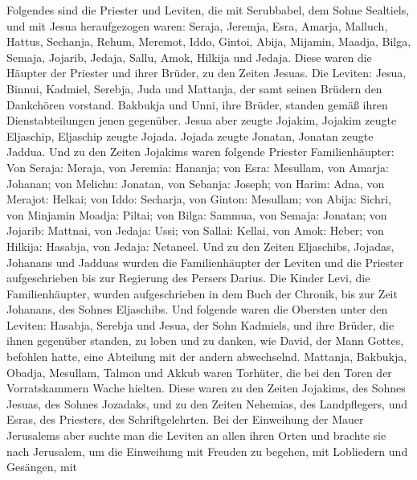  Folgendes sind die Priester und Leviten, die mit
Serubbabel, dem Sohne Sealtiels, und mit Jesua heraufgezogen waren:
Seraja, Jeremja, Esra,  Amarja, Malluch, Hattus, Sechanja,
 Rehum, Meremot, Iddo,  Gintoi, Abija,
Mijamin, Maadja, Bilga,  Semaja, Jojarib, 
Jedaja, Sallu, Amok, Hilkija und Jedaja.  Diese waren die
Häupter der Priester und ihrer Brüder, zu den Zeiten Jesuas.
 Die Leviten: Jesua, Binnui, Kadmiel, Serebja, Juda und
Mattanja, der samt seinen Brüdern den Dankchören vorstand.
 Bakbukja und Unni, ihre Brüder, standen gemäß ihren
Dienstabteilungen jenen gegenüber.  Jesua aber zeugte
Jojakim, Jojakim zeugte Eljaschip, Eljaschip zeugte Jojada.
 Jojada zeugte Jonatan, Jonatan zeugte Jaddua.
 Und zu den Zeiten Jojakims waren folgende Priester
Familienhäupter: Von Seraja: Meraja, von Jeremia: Hananja;
 von Esra: Mesullam, von Amarja: Johanan; 
von Melichu: Jonatan, von Sebanja: Joseph;  von Harim:
Adna, von Merajot: Helkai;  von Iddo: Secharja, von
Ginton: Mesullam;  von Abija: Sichri, von Minjamin
Moadja: Piltai;  von Bilga: Sammua, von Semaja: Jonatan;
 von Jojarib: Mattnai, von Jedaja: Ussi; 
von Sallai: Kellai, von Amok: Heber;  von Hilkija:
Hasabja, von Jedaja: Netaneel.  Und zu den Zeiten
Eljaschibs, Jojadas, Johanans und Jadduas wurden die Familienhäupter der
Leviten und die Priester aufgeschrieben bis zur Regierung des Persers
Darius.  Die Kinder Levi, die Familienhäupter, wurden
aufgeschrieben in dem Buch der Chronik, bis zur Zeit Johanans, des
Sohnes Eljaschibs.  Und folgende waren die Obersten unter
den Leviten: Hasabja, Serebja und Jesua, der Sohn Kadmiels, und ihre
Brüder, die ihnen gegenüber standen, zu loben und zu danken, wie David,
der Mann Gottes, befohlen hatte, eine Abteilung mit der andern
abwechselnd.  Mattanja, Bakbukja, Obadja, Mesullam,
Talmon und Akkub waren Torhüter, die bei den Toren der Vorratskammern
Wache hielten.  Diese waren zu den Zeiten Jojakims, des
Sohnes Jesuas, des Sohnes Jozadaks, und zu den Zeiten Nehemias, des
Landpflegers, und Esras, des Priesters, des Schriftgelehrten.
 Bei der Einweihung der Mauer Jerusalems aber suchte man
die Leviten an allen ihren Orten und brachte sie nach Jerusalem, um die
Einweihung mit Freuden zu begehen, mit Lobliedern und Gesängen, mit
